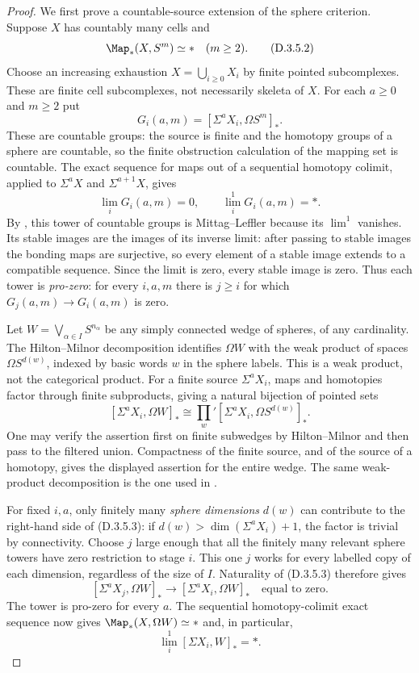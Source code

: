 \begin{proof}
We first prove a countable-source extension of the sphere
criterion. Suppose $X$ has countably many cells and
\[
             \Map_*(X,S^m)\simeq *\quad(m\geq2).
 \tag{D.3.5.2}
\]
Choose an increasing exhaustion $X=\bigcup_{i\geq0}X_i$
by finite pointed subcomplexes. These are finite cell
subcomplexes, not necessarily skeleta of $X$.
For each $a\geq0$ and $m\geq2$ put
\[
       G_i(a,m)=[\Sigma^aX_i,\Omega S^m]_*.
\]
These are countable groups: the source is finite and the
homotopy groups of a sphere are countable, so the finite
obstruction calculation of the mapping set is countable.
The exact sequence for maps out of a sequential homotopy
colimit, applied to $\Sigma^aX$ and $\Sigma^{a+1}X$, gives
\[
       \lim_iG_i(a,m)=0,\qquad
       \lim_i^1G_i(a,m)=*.
\]
By \cite[Proposition~4(b)]{I_Strom2012}, this tower of
countable groups is Mittag--Leffler because its $\lim^1$ vanishes.
Its stable images are the images of its inverse limit:
after passing to stable images the bonding maps are
surjective, so every element of a stable image extends to a
compatible sequence. Since the limit is zero, every stable
image is zero. Thus each tower is \emph{pro-zero}:
for every $i,a,m$ there is $j\geq i$ for which
$G_j(a,m)\to G_i(a,m)$ is zero.

Let $W=\bigvee_{\alpha\in I}S^{n_\alpha}$ be any simply
connected wedge of spheres, of any cardinality. The
Hilton--Milnor decomposition identifies $\Omega W$ with
the weak product of spaces $\Omega S^{d(w)}$, indexed by
basic words $w$ in the sphere labels. This is a weak
product, not the categorical product. For a finite source
$\Sigma^aX_i$, maps and homotopies factor through finite
subproducts, giving a natural bijection of pointed sets
\[
 [\Sigma^aX_i,\Omega W]_*
   \cong\prod_w' [\Sigma^aX_i,\Omega S^{d(w)}]_*.
 \tag{D.3.5.3}
\]
One may verify the assertion first on finite subwedges by
Hilton--Milnor and then pass to the filtered union. Compactness
of the finite source, and of the source of a homotopy, gives
the displayed assertion for the entire wedge. The same
weak-product decomposition is the one used in
\cite[proof of Proposition~6]{I_Strom2012}.

For fixed $i,a$, only finitely many \emph{sphere dimensions}
$d(w)$ can contribute to the right-hand side of
(D.3.5.3): if $d(w)>\dim(\Sigma^aX_i)+1$, the factor is
trivial by connectivity. Choose $j$ large enough that all
the finitely many relevant sphere towers have zero
restriction to stage $i$. This one $j$ works for every
labelled copy of each dimension, regardless of the size of
$I$. Naturality of (D.3.5.3) therefore gives
\[
 [\Sigma^aX_j,\Omega W]_*
       \longrightarrow[\Sigma^aX_i,\Omega W]_*
       \quad\text{equal to zero}.
\]
The tower is pro-zero for every $a$. The sequential
homotopy-colimit exact sequence now gives
$\Map_*(X,\Omega W)\simeq *$ and, in particular,
\[
                \lim_i^1[\Sigma X_i,W]_* = *.
 \tag{D.3.5.4}
\]


\end{proof}
